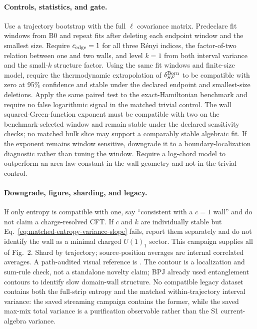 \documentclass[aps,prx,onecolumn,nofootinbib,superscriptaddress,longbibliography]{revtex4-2}
\begin{document}
\paragraph{Controls, statistics, and gate.}
Use a trajectory bootstrap with the full $\ell$ covariance matrix.  Predeclare fit windows
from B0 and repeat fits after deleting each endpoint window and the smallest size.  Require
$c_{\rm edge}=1$ for all three R\'enyi indices, the factor-of-two relation between one and two
walls, and level $k=1$ from both interval variance and the small-$k$ structure factor.
Using the same fit windows and finite-size model, require the thermodynamic extrapolation
of $\delta_{SF}^{\rm Born}$ to be compatible with zero at 95\% confidence and stable under
the declared endpoint and smallest-size deletions.  Apply the same paired test to the
exact-Hamiltonian benchmark and require no false logarithmic signal in the matched trivial
control.  The wall squared-Green-function exponent must be compatible with two on the
benchmark-selected window and remain stable under the declared sensitivity checks; no
matched bulk slice may support a comparably stable algebraic fit.  If the exponent remains
window sensitive, downgrade it to a boundary-localization diagnostic rather than tuning
the window.  Require a log-chord model to outperform an area-law constant in the wall
geometry and not in the trivial control.

\paragraph{Downgrade, figure, sharding, and legacy.}
If only entropy is compatible with one, say ``consistent with a $c=1$ wall'' and do not
claim a charge-resolved CFT.  If $c$ and $k$ are individually stable but
Eq.~\eqref{eq:matched-entropy-variance-slope} fails, report them separately and do not
identify the wall as a minimal charged $U(1)_1$ sector.  This campaign supplies all of
Fig.~2.  Shard by trajectory;
source-position averages are internal correlated averages.  A path-audited visual reference
is .
The contour is a localization and sum-rule
check, not a standalone novelty claim; BPJ already used entanglement contours to identify
slow domain-wall structure.  No compatible legacy dataset contains both the full-strip
entropy and the matched within-trajectory interval variance: the saved streaming campaign
contains the former, while the saved max-mix total variance is a purification observable
rather than the S1 current-algebra variance.
\end{document}
